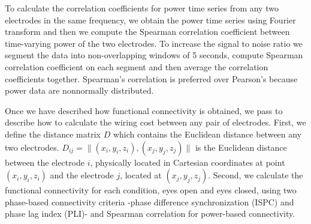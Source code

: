 \documentclass[11pt, onecolumn]{article}
\begin{document}
To calculate the correlation coefficients for power time series from any two electrodes in the same frequency, we obtain the power time series using Fourier transform and then we compute the Spearman correlation coefficient between time-varying power of the two electrodes. To increase the signal to noise ratio we segment the data into non-overlapping windows of 5 seconds, compute Spearman correlation coefficient on each segment and then average the correlation coefficients together. Spearman's correlation is preferred over Pearson's because power data are 
nonnormally distributed.

Once we have described how functional connectivity is obtained, we pass to describe how to calculate the wiring cost between any pair of electrodes.
First, we define the distance matrix $D$ which contains the Euclidean distance between any two electrodes. $D_{ij} = \Big\|(x_i,y_i,z_i),(x_j,y_j,z_j) \Big\|$ is the Euclidean distance between the electrode $i$, physically located in Cartesian coordinates at point $(x_i,y_i,z_i)$ and the electrode $j$, located at $(x_j,y_j,z_j)$.
Second, we calculate the functional connectivity for each condition, eyes open and eyes closed, using two phase-based connectivity criteria -phase difference synchronization (ISPC) and phase lag index (PLI)- and Spearman correlation for power-based connectivity. %
\end{document}
